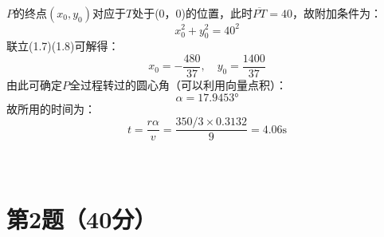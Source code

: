 \documentclass{ctexart}
\begin{document}
\noindent $P$的终点$(x_0,y_0)$对应于$T$处于(0，0)的位置，此时$\overline{PT}=40$，故附加条件为：
\begin{equation}
    x_0^2+y_0^2=40^2 \tag{1.8}
\end{equation}
联立(1.7)(1.8)可解得：
\begin{equation}
    x_0=-\frac{480}{37},\quad y_0=\frac{1400}{37} \tag{1.9}
\end{equation}
由此可确定$P$全过程转过的圆心角（可以利用向量点积）：
\begin{equation}
    \alpha=17.9453° \tag{1.10}
\end{equation}
故所用的时间为：
\begin{equation}
    t=\frac{r\alpha}{v}=\frac{350/3\times 0.3132}{9}=4.06\mathrm{s} \tag{1.11}
\end{equation}
\\
\\

\section*{第2题（40分）}
\end{document}
